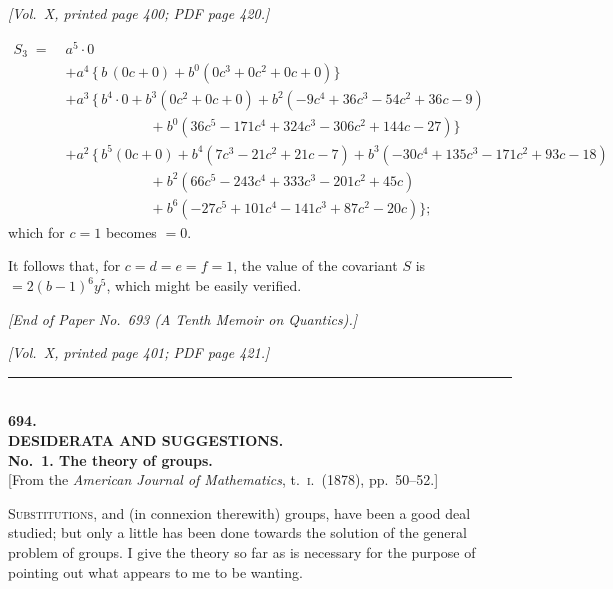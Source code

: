 \documentclass[11pt]{article}
\begin{document}
\newpage

\noindent\textit{[Vol.~X, printed page 400; PDF page 420.]}

\medskip

\begin{align*}
S_{3} \;=\;& a^{5}\!\cdot 0 \\
&+ a^{4}\,\bigl\{\,b\,(0c+0) + b^{0}(0c^{3}+0c^{2}+0c+0)\bigr\} \\
&+ a^{3}\,\bigl\{\,b^{4}\!\cdot 0 + b^{3}(0c^{2}+0c+0) + b^{2}(-9c^{4}+36c^{3}-54c^{2}+36c-9) \\
&\hspace{6em} + b^{0}(36c^{5}-171c^{4}+324c^{3}-306c^{2}+144c-27)\bigr\} \\
&+ a^{2}\,\bigl\{\,b^{5}(0c+0) + b^{4}(7c^{3}-21c^{2}+21c-7) + b^{3}(-30c^{4}+135c^{3}-171c^{2}+93c-18) \\
&\hspace{6em} + b^{2}(66c^{5}-243c^{4}+333c^{3}-201c^{2}+45c) \\
&\hspace{6em} + b^{6}(-27c^{5}+101c^{4}-141c^{3}+87c^{2}-20c)\bigr\};
\end{align*}
which for $c = 1$ becomes $= 0$.

\medskip

It follows that, for $c = d = e = f = 1$, the value of the covariant $S$ is $= 2(b-1)^{6}y^{5}$, which might be easily verified.

\bigskip
\bigskip

\noindent\textit{[End of Paper No.~693 (A Tenth Memoir on Quantics).]}

\bigskip
\bigskip
\bigskip

\newpage

\noindent\textit{[Vol.~X, printed page 401; PDF page 421.]}

\begin{center}
\rule{0.35\textwidth}{0.4pt}\\[8pt]
\large\textbf{694.}\\[6pt]
\Large\textbf{DESIDERATA AND SUGGESTIONS.}\\[8pt]
\large\textbf{No.~1. The theory of groups.}\\[6pt]
\small [From the \textit{American Journal of Mathematics}, t.~\textsc{i}.\ (1878), pp.~50--52.]
\end{center}

\bigskip

\noindent\textsc{Substitutions}, and (in connexion therewith) groups, have been a good deal studied; but only a little has been done towards the solution of the general problem of groups. I give the theory so far as is necessary for the purpose of pointing out what appears to me to be wanting.
\end{document}
